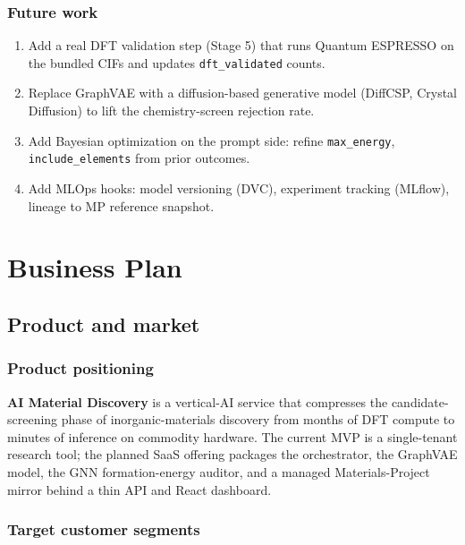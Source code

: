 \documentclass[11pt,a4paper]{report}
\begin{document}
\section{Future work}

\begin{enumerate}[leftmargin=*,itemsep=2pt]
\item Add a real DFT validation step (Stage 5) that runs Quantum ESPRESSO on the bundled
      CIFs and updates \texttt{dft\_validated} counts.
\item Replace GraphVAE with a diffusion-based generative model (DiffCSP, Crystal Diffusion)
      to lift the chemistry-screen rejection rate.
\item Add Bayesian optimization on the prompt side: refine \texttt{max\_energy},
      \texttt{include\_elements} from prior outcomes.
\item Add MLOps hooks: model versioning (DVC), experiment tracking (MLflow), lineage to MP
      reference snapshot.
\end{enumerate}

\part{Business Plan}

\chapter{Product and market}

\section{Product positioning}

\textbf{AI Material Discovery} is a vertical-AI service that compresses the
candidate-screening phase of inorganic-materials discovery from months of DFT compute to
minutes of inference on commodity hardware. The current MVP is a single-tenant research
tool; the planned SaaS offering packages the orchestrator, the GraphVAE model, the GNN
formation-energy auditor, and a managed Materials-Project mirror behind a thin API and
React dashboard.

\section{Target customer segments}
\end{document}
